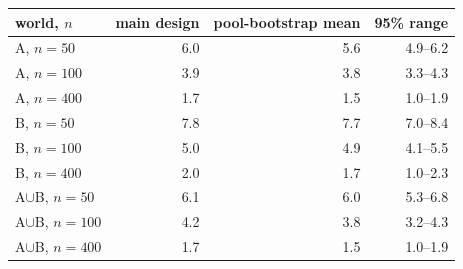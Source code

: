 \begin{tabular}{lrrr}\toprule
world, $n$ & main design & pool-bootstrap mean & 95\% range \\\midrule
A, $n{=}50$ & 6.0 & 5.6 & 4.9--6.2 \\
A, $n{=}100$ & 3.9 & 3.8 & 3.3--4.3 \\
A, $n{=}400$ & 1.7 & 1.5 & 1.0--1.9 \\
B, $n{=}50$ & 7.8 & 7.7 & 7.0--8.4 \\
B, $n{=}100$ & 5.0 & 4.9 & 4.1--5.5 \\
B, $n{=}400$ & 2.0 & 1.7 & 1.0--2.3 \\
A$\cup$B, $n{=}50$ & 6.1 & 6.0 & 5.3--6.8 \\
A$\cup$B, $n{=}100$ & 4.2 & 3.8 & 3.2--4.3 \\
A$\cup$B, $n{=}400$ & 1.7 & 1.5 & 1.0--1.9 \\
\bottomrule
\end{tabular}
